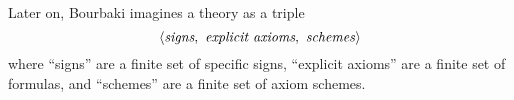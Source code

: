 \begin{definition}
  Later on, Bourbaki imagines a theory as a triple
\[\langle\textit{signs},~\textit{explicit\ axioms},~\textit{schemes\/}\rangle\]
where ``signs'' are a finite set of specific signs, ``explicit axioms''
are a finite set of formulas, and ``schemes'' are a finite set of axiom
schemes.
\end{definition}
